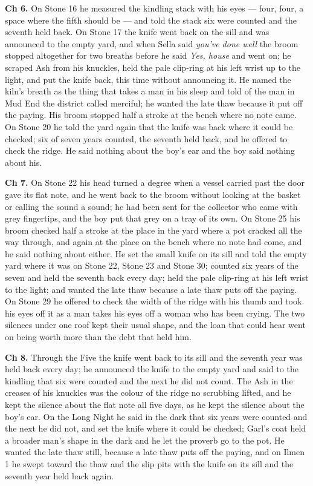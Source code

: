 \documentclass{design/chronicle}
\begin{document}
{\textbf{Ch 6.} On Stone 16 he measured the kindling stack with his eyes --- four, four, a space where the fifth should be --- and told the stack six were counted and the seventh held back. On Stone 17 the knife went back on the sill and was announced to the empty yard, and when Sella said \emph{you’ve done well} the broom stopped altogether for two breaths before he said \emph{Yes, house} and went on; he scraped Ash from his knuckles, held the pale clip-ring at his left wrist up to the light, and put the knife back, this time without announcing it. He named the kiln’s breath as the thing that takes a man in his sleep and told of the man in Mud End the district called merciful; he wanted the late thaw because it put off the paying. His broom stopped half a stroke at the bench where no note came. On Stone 20 he told the yard again that the knife was back where it could be checked; six of seven years counted, the seventh held back, and he offered to check the ridge. He said nothing about the boy’s ear and the boy said nothing about his.

\textbf{Ch 7.} On Stone 22 his head turned a degree when a vessel carried past the door gave its flat note, and he went back to the broom without looking at the basket or calling the sound a sound; he had been sent for the collector who came with grey fingertips, and the boy put that grey on a tray of its own. On Stone 25 his broom checked half a stroke at the place in the yard where a pot cracked all the way through, and again at the place on the bench where no note had come, and he said nothing about either. He set the small knife on its sill and told the empty yard where it was on Stone 22, Stone 23 and Stone 30; counted six years of the seven and held the seventh back every day; held the pale clip-ring at his left wrist to the light; and wanted the late thaw because a late thaw puts off the paying. On Stone 29 he offered to check the width of the ridge with his thumb and took his eyes off it as a man takes his eyes off a woman who has been crying. The two silences under one roof kept their usual shape, and the loan that could hear went on being worth more than the debt that held him.

\textbf{Ch 8.} Through the Five the knife went back to its sill and the seventh year was held back every day; he announced the knife to the empty yard and said to the kindling that six were counted and the next he did not count. The Ash in the creases of his knuckles was the colour of the ridge no scrubbing lifted, and he kept the silence about the flat note all five days, as he kept the silence about the boy’s ear. On the Long Night he said in the dark that six years were counted and the next he did not, and set the knife where it could be checked; Garl’s coat held a broader man’s shape in the dark and he let the proverb go to the pot. He wanted the late thaw still, because a late thaw puts off the paying, and on Ilmen 1 he swept toward the thaw and the slip pits with the knife on its sill and the seventh year held back again.

}
\end{document}
